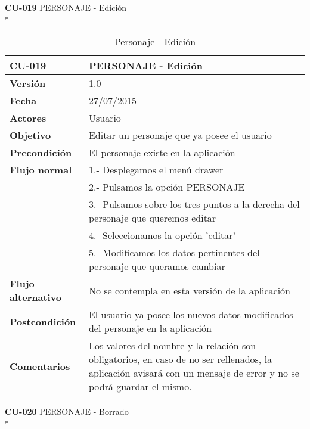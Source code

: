 \documentclass[../pfc.tex]{subfiles}
\begin{document}
		\textbf{CU-019}	PERSONAJE - Edición\\*
		
		\begin{table}[H]
			\centering
			\begin{tabular}[t]{|p{3cm}|p{9.5cm}|}
				\hline \textbf{CU-019} & \textbf{PERSONAJE - Edición} \\*
				\hline\hline \textbf{Versión} & 1.0 \\*
				\hline\hline \textbf{Fecha} & 27/07/2015 \\*
				\hline\textbf{Actores} 	& Usuario\\*
				\hline \textbf{Objetivo} & Editar un personaje que ya posee el usuario\\* 			
				\hline \textbf{Precondición} & El personaje existe en la aplicación\\* 
				\hline \textbf{Flujo normal} & 1.- Desplegamos el menú drawer \\* 
				& 2.- Pulsamos la opción PERSONAJE\\*	
				& 3.- Pulsamos sobre los tres puntos a la derecha del personaje que queremos editar\\*	
				& 4.- Seleccionamos la opción 'editar'\\*	
				& 5.- Modificamos los datos pertinentes del personaje que queramos cambiar\\*	
				\hline \textbf{Flujo alternativo} & No se contempla en esta versión de la aplicación \\* 
				\hline \textbf{Postcondición} & El usuario ya posee los nuevos datos modificados del personaje en la aplicación \\* 
				\hline \textbf{Comentarios}   & Los valores del nombre y la relación son obligatorios, en caso de no ser rellenados, la aplicación avisará con un mensaje de error y no se podrá guardar el mismo.\\*
				\hline
			\end{tabular}
			\caption{Personaje - Edición}
			\label{tabla:caso019}
		\end{table}
		
		\textbf{CU-020}	PERSONAJE - Borrado\\*
		
\end{document}

